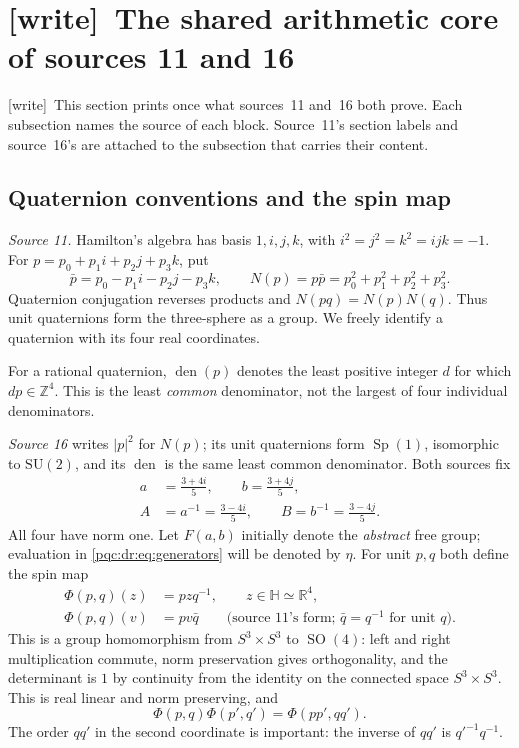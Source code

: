 \documentclass[11pt,letterpaper]{article}
\numberwithin{equation}{section}
\theoremstyle{definition}
\theoremstyle{remark}
\newcommand{\Z}{\mathbb Z}
\newcommand{\R}{\mathbb R}
\newcommand{\wtag}{\textup{[write]}}
\newcommand{\HH}{\mathbb H}
\newcommand{\Sphere}{S^3}
\newcommand{\SO}{\operatorname{SO}}
\newcommand{\Sp}{\operatorname{Sp}}
\newcommand{\den}{\operatorname{den}}
\begin{document}
\section{\wtag\ The shared arithmetic core of sources 11 and 16}
\label{pqc:gates:sec:core}
\wtag\ This section prints once what sources~11 and~16 both prove. Each
subsection names the source of each block. Source~11's section labels and
source~16's are attached to the subsection that carries their content.

\subsection{Quaternion conventions and the spin map}
\label{pqc:rr:sec:quaternions}\label{pqc:gates:sec:quaternions}
\emph{Source 11.}
Hamilton's algebra has basis $1,i,j,k$, with $i^2=j^2=k^2=ijk=-1$.
For $p=p_0+p_1i+p_2j+p_3k$, put
\[
 \bar p=p_0-p_1i-p_2j-p_3k,\qquad
 N(p)=p\bar p=p_0^2+p_1^2+p_2^2+p_3^2.
\]
Quaternion conjugation reverses products and $N(pq)=N(p)N(q)$.
Thus unit quaternions form the three-sphere as a group. We freely identify
a quaternion with its four real coordinates.

For a rational quaternion, $\den(p)$ denotes the least positive integer
$d$ for which $dp\in\Z^4$. This is the least \emph{common} denominator,
not the largest of four individual denominators.

\emph{Source 16} writes $|p|^2$ for $N(p)$; its unit quaternions form $\Sp(1)$,
isomorphic to $\mathrm{SU}(2)$, and its $\den$ is the same least common
denominator. Both sources fix
\begin{align}
 a&=\frac{3+4i}{5},\qquad b=\frac{3+4j}{5},\label{pqc:rr:eq:alphabeta}\\
 A&=a^{-1}=\frac{3-4i}{5},\qquad B=b^{-1}=\frac{3-4j}{5}.\label{pqc:dr:eq:generators}
\end{align}
All four have norm one. Let $F(a,b)$ initially denote the \emph{abstract}
free group; evaluation in \eqref{pqc:dr:eq:generators} will be denoted by $\eta$.
For unit $p,q$ both define the spin map
\begin{align}
 \Phi(p,q)(z)&=pzq^{-1},\qquad z\in\HH\simeq\R^4,\label{pqc:dr:eq:phi}\\
 \Phi(p,q)(v)&=pv\bar q\qquad\text{(source 11's form; $\bar q=q^{-1}$ for unit $q$).}\label{pqc:rr:eq:spin}
\end{align}
This is a group homomorphism from $\Sphere\times\Sphere$ to $\SO(4)$:
left and right multiplication commute, norm preservation gives
orthogonality, and the determinant is $1$ by continuity from the identity
on the connected space $\Sphere\times\Sphere$.
This is real linear and norm preserving, and
\begin{equation}
 \Phi(p,q)\Phi(p',q')=\Phi(pp',qq').
 \label{pqc:dr:eq:phihom}
\end{equation}
The order $qq'$ in the second coordinate is important: the inverse of
$qq'$ is $q'^{-1}q^{-1}$.
\end{document}
